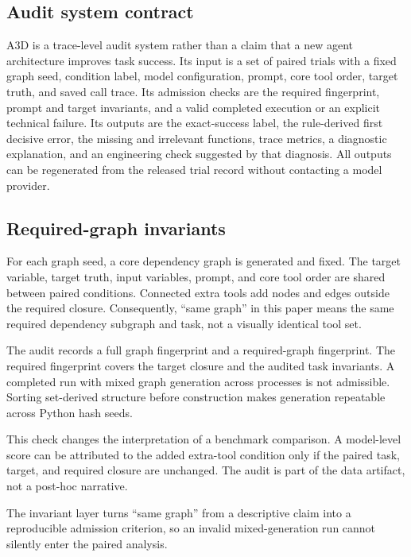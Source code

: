 \documentclass[pdflatex,sn-basic]{sn-jnl}
\begin{document}
\subsection{Audit system contract}

A3D is a trace-level audit system rather than a claim that a new agent
architecture improves task success. Its input is a set of paired trials with a
fixed graph seed, condition label, model configuration, prompt, core tool order,
target truth, and saved call trace. Its admission checks are the required
fingerprint, prompt and target invariants, and a valid completed execution or an
explicit technical failure. Its outputs are the exact-success label, the
rule-derived first decisive error, the missing and irrelevant functions, trace
metrics, a diagnostic explanation, and an engineering check suggested by that
diagnosis. All outputs can be regenerated from the released trial record without
contacting a model provider.

\subsection{Required-graph invariants}

For each graph seed, a core dependency graph is generated and fixed. The target
variable, target truth, input variables, prompt, and core tool order are shared
between paired conditions. Connected extra tools add nodes and edges outside the
required closure. Consequently, ``same graph'' in this paper means the same
required dependency subgraph and task, not a visually identical tool set.

The audit records a full graph fingerprint and a required-graph fingerprint.
The required fingerprint covers the target closure and the audited task
invariants. A completed run with mixed graph generation across processes is not
admissible. Sorting set-derived structure before construction makes generation
repeatable across Python hash seeds.

This check changes the interpretation of a benchmark comparison. A model-level
score can be attributed to the added extra-tool condition only if the paired
task, target, and required closure are unchanged. The audit is part of the data
artifact, not a post-hoc narrative.

The invariant layer turns ``same graph'' from a descriptive claim into a
reproducible admission criterion, so an invalid mixed-generation run cannot
silently enter the paired analysis.
\end{document}
